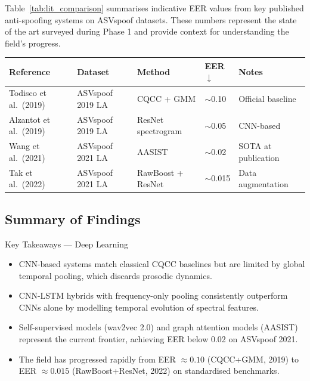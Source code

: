 \documentclass[12pt,a4paper]{article}
\begin{document}
Table~\ref{tab:lit_comparison} summarises indicative EER values from key published
anti-spoofing systems on ASVspoof datasets. These numbers represent the state of the
art surveyed during Phase 1 and provide context for understanding the field's progress.

\medskip
\begin{center}
\begin{tabular}{L{3.2cm}C{2.8cm}L{3.8cm}C{1.6cm}L{2.6cm}}
  \toprule
  \color{white}\textbf{Reference} &
  \color{white}\textbf{Dataset} &
  \color{white}\textbf{Method} &
  \color{white}\textbf{EER $\downarrow$} &
  \color{white}\textbf{Notes} \\
  \midrule
  Todisco et al.\ (2019) &
  ASVspoof 2019 LA & CQCC + GMM & $\sim$0.10 & Official baseline \\
  Alzantot et al.\ (2019) &
  ASVspoof 2019 LA & ResNet spectrogram & $\sim$0.05 & CNN-based \\
  Wang et al.\ (2021) &
  ASVspoof 2021 LA & AASIST & $\sim$0.02 & SOTA at publication \\
  Tak et al.\ (2022) &
  ASVspoof 2021 LA & RawBoost + ResNet & $\sim$0.015 & Data augmentation \\
  \bottomrule
\end{tabular}
\label{tab:lit_comparison}
\end{center}

\subsection{Summary of Findings}

\begin{keybox}{Key Takeaways --- Deep Learning}
  \begin{itemize}
    \item CNN-based systems match classical CQCC baselines but are limited by global
      temporal pooling, which discards prosodic dynamics.
    \item CNN-LSTM hybrids with frequency-only pooling consistently outperform CNNs
      alone by modelling temporal evolution of spectral features.
    \item Self-supervised models (wav2vec 2.0) and graph attention models (AASIST)
      represent the current frontier, achieving EER below 0.02 on ASVspoof 2021.
    \item The field has progressed rapidly from EER $\approx 0.10$ (CQCC+GMM, 2019)
      to EER $\approx 0.015$ (RawBoost+ResNet, 2022) on standardised benchmarks.
  \end{itemize}
\end{keybox}
\end{document}
